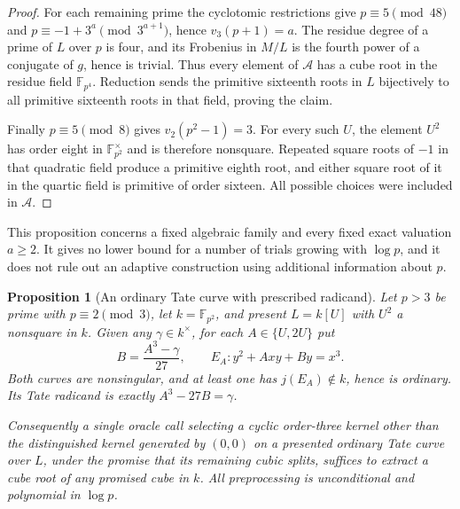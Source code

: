 \documentclass[11pt]{article}
\newtheorem{proposition}[theorem]{Proposition}
\theoremstyle{definition}
\theoremstyle{remark}
\begin{document}
\begin{proof}
For each remaining prime the cyclotomic restrictions give
$p\equiv5\pmod{48}$ and
$p\equiv-1+3^a\pmod{3^{a+1}}$, hence $v_3(p+1)=a$.
The residue degree of a prime of $L$ over $p$ is four,
and its Frobenius in $M/L$ is the fourth power of a
conjugate of $g$, hence is trivial.  Thus every element
of $\mathcal A$ has a cube root in the residue field
$\mathbb F_{p^4}$.  Reduction sends the primitive
sixteenth roots in $L$ bijectively to all primitive
sixteenth roots in that field, proving the claim.

Finally $p\equiv5\pmod8$ gives $v_2(p^2-1)=3$.
For every such $U$, the element $U^2$ has order eight
in $\mathbb F_{p^2}^\times$ and is therefore nonsquare.
Repeated square roots of $-1$ in that quadratic field
produce a primitive eighth root, and either square root
of it in the quartic field is primitive of order sixteen.
All possible choices were included in $\mathcal A$.
\end{proof}

This proposition concerns a fixed algebraic family and every fixed
exact valuation $a\ge2$.  It gives no lower bound for a number of
trials growing with $\log p$, and it does not rule out an adaptive
construction using additional information about $p$.

\begin{proposition}[An ordinary Tate curve with prescribed radicand]
\label{prop:ordinary-prescribed-radicand}
Let $p>3$ be prime with $p\equiv2\pmod3$, let
$k=\mathbb F_{p^2}$, and present $L=k[U]$ with $U^2$ a
nonsquare in $k$.  Given any $\gamma\in k^\times$, for each
$A\in\{U,2U\}$ put
\[
 B=\frac{A^3-\gamma}{27},\qquad
 E_A:y^2+Axy+By=x^3.
\]
Both curves are nonsingular, and at least one has
$j(E_A)\notin k$, hence is ordinary.  Its Tate radicand is
exactly $A^3-27B=\gamma$.

Consequently a single oracle call selecting a cyclic order-three kernel other than the distinguished
kernel generated by $(0,0)$ on a presented ordinary Tate curve over $L$, under the promise
that its remaining cubic splits, suffices to extract a cube
root of any promised cube in $k$.  All preprocessing is
unconditional and polynomial in $\log p$.
\end{proposition}
\end{document}
